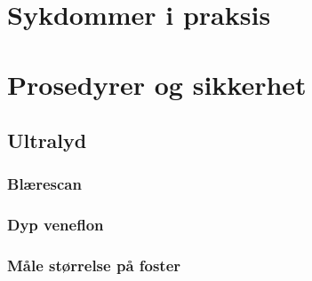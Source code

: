 \documentclass[a4paper,12pt,twoside]{memoir}
\begin{document}
\sffamily

			\renewcommand{\partname}{Del}
			\renewcommand{\chaptername}{Kapittel}
            \renewcommand{\contentsname}{Innhold}
            \renewcommand\listfigurename{Illustrasjoner}
            \renewcommand\tablename{Tabell}
			\renewcommand\listtablename{Tabeller}
            \renewcommand{\figurename}{Illustrasjon}
			\renewcommand{\bibname}{Kilder:}

\frontmatter
	
	
\mainmatter
	\part{Sykdommer i praksis}	

	\part{Prosedyrer og sikkerhet}
			\chapter{Ultralyd}
				\section{Blærescan}
				\section{Dyp veneflon}
				\section{Måle størrelse på foster}
\end{document}
